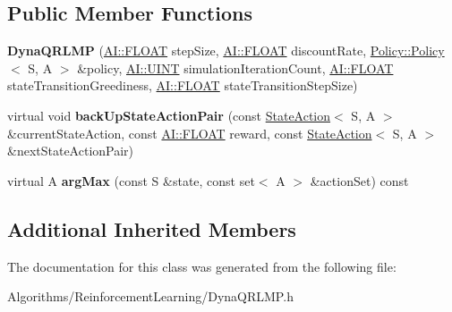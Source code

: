 \subsection*{Public Member Functions}
\begin{DoxyCompactItemize}
\item 
\hypertarget{classAI_1_1Algorithm_1_1DynaQRLMP_a79f36f74cf9de4649b07df5d46282598}{{\bfseries Dyna\-Q\-R\-L\-M\-P} (\hyperlink{namespaceAI_a41b74884a20833db653dded3918e05c3}{A\-I\-::\-F\-L\-O\-A\-T} step\-Size, \hyperlink{namespaceAI_a41b74884a20833db653dded3918e05c3}{A\-I\-::\-F\-L\-O\-A\-T} discount\-Rate, \hyperlink{classAI_1_1Algorithm_1_1Policy_1_1Policy}{Policy\-::\-Policy}$<$ S, A $>$ \&policy, \hyperlink{namespaceAI_ab6e14dc1e659854858a87e511f1439ec}{A\-I\-::\-U\-I\-N\-T} simulation\-Iteration\-Count, \hyperlink{namespaceAI_a41b74884a20833db653dded3918e05c3}{A\-I\-::\-F\-L\-O\-A\-T} state\-Transition\-Greediness, \hyperlink{namespaceAI_a41b74884a20833db653dded3918e05c3}{A\-I\-::\-F\-L\-O\-A\-T} state\-Transition\-Step\-Size)}\label{classAI_1_1Algorithm_1_1DynaQRLMP_a79f36f74cf9de4649b07df5d46282598}

\item 
\hypertarget{classAI_1_1Algorithm_1_1DynaQRLMP_a7b3b5f3706744290b12c19f786e5e4e4}{virtual void {\bfseries back\-Up\-State\-Action\-Pair} (const \hyperlink{classAI_1_1StateAction}{State\-Action}$<$ S, A $>$ \&current\-State\-Action, const \hyperlink{namespaceAI_a41b74884a20833db653dded3918e05c3}{A\-I\-::\-F\-L\-O\-A\-T} reward, const \hyperlink{classAI_1_1StateAction}{State\-Action}$<$ S, A $>$ \&next\-State\-Action\-Pair)}\label{classAI_1_1Algorithm_1_1DynaQRLMP_a7b3b5f3706744290b12c19f786e5e4e4}

\item 
\hypertarget{classAI_1_1Algorithm_1_1DynaQRLMP_a57a8d01392c4a3699853f3aa623d9ebf}{virtual A {\bfseries arg\-Max} (const S \&state, const set$<$ A $>$ \&action\-Set) const }\label{classAI_1_1Algorithm_1_1DynaQRLMP_a57a8d01392c4a3699853f3aa623d9ebf}

\end{DoxyCompactItemize}
\subsection*{Additional Inherited Members}


The documentation for this class was generated from the following file\-:\begin{DoxyCompactItemize}
\item 
Algorithms/\-Reinforcement\-Learning/Dyna\-Q\-R\-L\-M\-P.\-h\end{DoxyCompactItemize}
